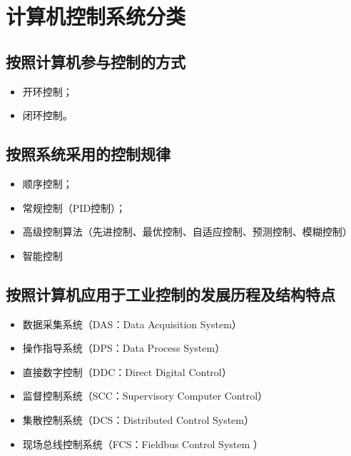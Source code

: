 \section{计算机控制系统分类}

\subsection{按照计算机参与控制的方式}

\begin{itemize}
  \item 开环控制；
  \item 闭环控制。
\end{itemize}

\subsection{按照系统采用的控制规律}


\begin{itemize}
  \item 顺序控制；
  \item 常规控制（PID控制）；
  \item 高级控制算法（先进控制、最优控制、自适应控制、预测控制、模糊控制）
  \item 智能控制
\end{itemize}

\subsection{按照计算机应用于工业控制的发展历程及结构特点}



\begin{itemize}
  \item 数据采集系统（DAS：Data Acquisition System）

  \item 操作指导系统（DPS：Data Process System）

  \item 直接数字控制（DDC：Direct Digital Control）

  \item 监督控制系统（SCC：Supervisory Computer Control）

  \item 集散控制系统（DCS：Distributed Control System）

  \item 现场总线控制系统（FCS：Fieldbus Control System ）

\end{itemize}

